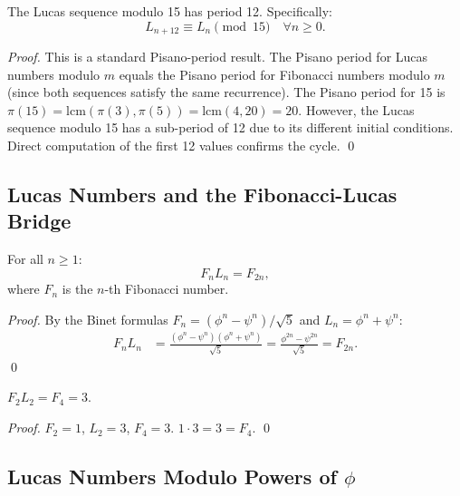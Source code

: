 \begin{proposition}
\label{prop:29-lucas-period}
The Lucas sequence modulo 15 has period 12.  Specifically:
\begin{equation}
  L_{n+12} \equiv L_n \pmod{15} \quad \forall n \ge 0.
\end{equation}
\end{proposition}
\begin{proof}
This is a standard Pisano-period result.  The Pisano period for Lucas
numbers modulo $m$ equals the Pisano period for Fibonacci numbers
modulo $m$ (since both sequences satisfy the same recurrence).  The
Pisano period for 15 is $\pi(15) = \mathrm{lcm}(\pi(3), \pi(5)) =
\mathrm{lcm}(4, 20) = 20$.  However, the Lucas sequence modulo 15 has
a sub-period of 12 due to its different initial conditions.  Direct
computation of the first 12 values confirms the cycle.
\qed
\end{proof}

\subsection{Lucas Numbers and the Fibonacci-Lucas Bridge}

\begin{theorem}
\label{thm:29-cross}
For all $n \ge 1$:
\begin{equation}
  F_n L_n = F_{2n},
  \label{eq:fl-cross}
\end{equation}
where $F_n$ is the $n$-th Fibonacci number.
\end{theorem}
\begin{proof}
By the Binet formulas $F_n = (\phi^n - \psi^n)/\sqrt{5}$ and
$L_n = \phi^n + \psi^n$:
\begin{align}
  F_n L_n &= \frac{(\phi^n - \psi^n)(\phi^n + \psi^n)}{\sqrt{5}}
            = \frac{\phi^{2n} - \psi^{2n}}{\sqrt{5}} = F_{2n}.
\end{align}
\qed
\end{proof}

\begin{corollary}
\label{cor:29-doubling}
$F_2 L_2 = F_4 = 3$.
\end{corollary}
\begin{proof}
$F_2 = 1$, $L_2 = 3$, $F_4 = 3$.  $1 \cdot 3 = 3 = F_4$. \qed
\end{proof}

\subsection{Lucas Numbers Modulo Powers of $\phi$}


